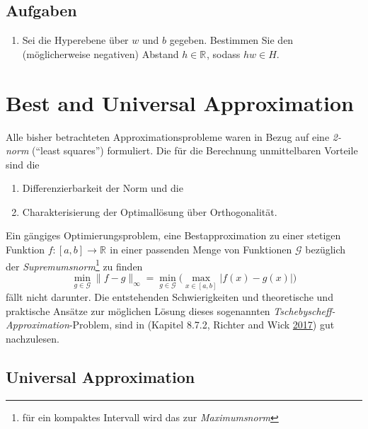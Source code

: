 \documentclass[
]{book}
\providecommand{\tightlist}{%
  \setlength{\itemsep}{0pt}\setlength{\parskip}{0pt}}
\theoremstyle{definition}
\theoremstyle{definition}
\theoremstyle{definition}
\theoremstyle{definition}
\theoremstyle{remark}
\begin{document}
\hypertarget{aufgaben-1}{%
\section{Aufgaben}\label{aufgaben-1}}

\begin{enumerate}
\def\labelenumi{\arabic{enumi}.}
\tightlist
\item
  Sei die Hyperebene über \(w\) und \(b\) gegeben. Bestimmen Sie den
  (möglicherweise negativen) Abstand
  \(h\in \mathbb R^{}\), sodass \(hw\in H\).
\end{enumerate}

\hypertarget{best-and-universal-approximation}{%
\chapter{Best and Universal Approximation}\label{best-and-universal-approximation}}

\def\PLab{\operatorname{PL}[a, b]}
\def\PCab{\operatorname{Pc}[a, b]}
\def\Cab{\mathcal{C}[a, b]}

Alle bisher betrachteten Approximationsprobleme waren in Bezug auf eine \emph{2-norm}
(``least squares'') formuliert. Die für die Berechnung unmittelbaren Vorteile
sind die

\begin{enumerate}
\def\labelenumi{\arabic{enumi}.}
\tightlist
\item
  Differenzierbarkeit der Norm und die
\item
  Charakterisierung der Optimallösung über Orthogonalität.
\end{enumerate}

Ein gängiges Optimierungsproblem, eine Bestapproximation zu einer stetigen
Funktion \(f\colon [a, b]\to \mathbb R^{}\) in einer passenden Menge von Funktionen
\(\mathcal G\) bezüglich der \emph{Supremumsnorm}\footnote{für ein kompaktes
  Intervall wird das zur \emph{Maximumsnorm}} zu finden
\begin{equation*}
\min_{g\in \mathcal G} \|f-g\|_\infty = 
\min_{g \in \mathcal G}\bigl (\max_{x\in [a, b]}|f(x)-g(x)|\bigr )
\end{equation*}
fällt nicht darunter.
Die entstehenden Schwierigkeiten und theoretische und praktische Ansätze
zur möglichen Lösung dieses sogenannten
\emph{Tschebyscheff-Approximation}-Problem, sind in (Kapitel 8.7.2, Richter and Wick \protect\hyperlink{ref-RicW17}{2017}) gut
nachzulesen.

\hypertarget{universal-approximation}{%
\section{Universal Approximation}\label{universal-approximation}}
\end{document}
